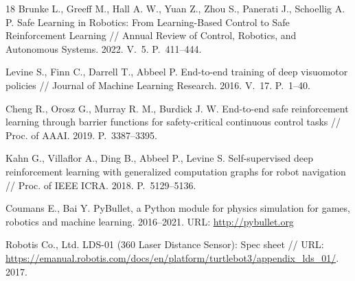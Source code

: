 \documentclass[11pt]{article}
\begin{document}
{\begin{thebibliography}{18}
Brunke L., Greeff M., Hall A. W., Yuan Z., Zhou S., Panerati J., Schoellig A. P. Safe Learning in Robotics: From Learning-Based Control to Safe Reinforcement Learning // Annual Review of Control, Robotics, and Autonomous Systems. 2022. V.~5. P.~411--444.

Levine S., Finn C., Darrell T., Abbeel P. End-to-end training of deep visuomotor policies
// Journal of Machine Learning Research. 2016. V.~17. P.~1--40.

Cheng R., Orosz G., Murray R. M., Burdick J. W. End-to-end safe reinforcement learning through barrier functions for safety-critical continuous control tasks
// Proc. of AAAI. 2019. P.~3387--3395.

Kahn G., Villaflor A., Ding B., Abbeel P., Levine S. Self-supervised deep reinforcement learning with generalized computation graphs for robot navigation // Proc. of IEEE ICRA. 2018. P.~5129--5136.

Coumans E., Bai Y. PyBullet, a Python module for physics simulation for games, robotics and machine learning. 2016--2021. URL: \url{http://pybullet.org}

Robotis Co., Ltd. LDS-01 (360 Laser Distance Sensor): Spec sheet // URL: \url{https://emanual.robotis.com/docs/en/platform/turtlebot3/appendix_lds_01/}. 2017.
\end{thebibliography}}
\end{document}
